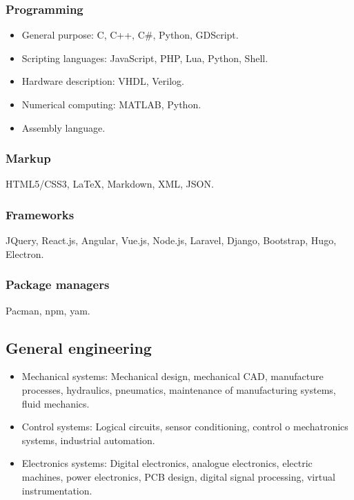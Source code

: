 \documentclass{article}
\begin{document}
    \subsubsection{Programming}

    \begin{itemize}
      \item General purpose: C, C++, C\#, Python, GDScript.
      \item Scripting languages: JavaScript, PHP, Lua, Python, Shell.
      \item Hardware description: VHDL, Verilog.
      \item Numerical computing: MATLAB, Python.
      \item Assembly language.
    \end{itemize}

    \subsubsection{Markup}

    HTML5/CSS3, {\LaTeX}, Markdown, XML, JSON\@.

    \subsubsection{Frameworks}

    JQuery, React.js, Angular, Vue.js, Node.js, Laravel, Django, Bootstrap, Hugo, Electron.

    \subsubsection{Package managers}

    Pacman, npm, yam.

    \subsection{General engineering}
    \begin{itemize}
      \item Mechanical systems: Mechanical design, mechanical CAD, manufacture processes, hydraulics, pneumatics, maintenance of manufacturing systems, fluid mechanics.
      \item Control systems: Logical circuits, sensor conditioning, control o mechatronics systems, industrial automation.
      \item Electronics systems: Digital electronics, analogue electronics, electric machines, power electronics, PCB design, digital signal processing, virtual instrumentation.
    \end{itemize}
\end{document}
